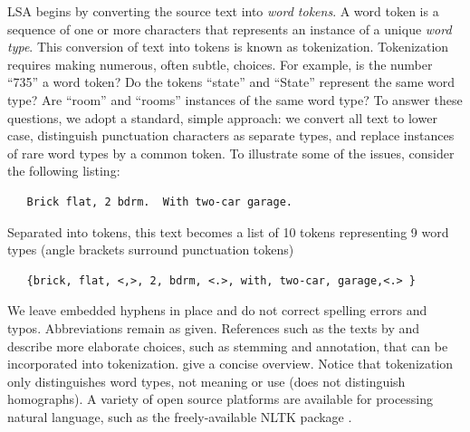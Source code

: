 \documentclass[12pt]{article}
\begin{document}
 LSA begins by converting the source text into {\em word tokens}.  A word token
 is a sequence of one or more characters that represents an instance of a unique
 {\em word type}.  This conversion of text into tokens is known as tokenization.
  Tokenization requires making numerous, often subtle, choices.  For example, is
 the number ``735'' a word token?  Do the tokens ``state'' and ``State''
 represent the same word type?  Are ``room'' and ``rooms'' instances of the same word
 type?  To answer these questions, we adopt a standard, simple approach: we
 convert all text to lower case, distinguish punctuation characters as separate
 types, and replace instances of rare word types by a common token.  To
 illustrate some of the issues, consider the following listing:
 \begin{verbatim}
   Brick flat, 2 bdrm.  With two-car garage. \end{verbatim} 
 \noindent
 Separated into tokens, this text becomes a list of 10 tokens representing 9
 word types (angle brackets surround punctuation tokens)
 \begin{verbatim}
   {brick, flat, <,>, 2, bdrm, <.>, with, two-car, garage,<.> } \end{verbatim} 
 \noindent
 We leave embedded hyphens in place and do not correct spelling errors and
 typos.  Abbreviations remain as given.  References such as the texts by
 \citet{manning99} and \citet{jurafsky09} describe more elaborate choices, such
 as stemming and annotation, that can be incorporated into
 tokenization. \citet{turney10} give a concise overview.  Notice that
 tokenization only distinguishes word types, not  meaning or use
 (does not distinguish homographs). A variety of open source platforms are
 available for processing natural language, such as the freely-available NLTK 
 package \citep[][ and on-line at http://www.nltk.org]{nltk09}.
\end{document}

